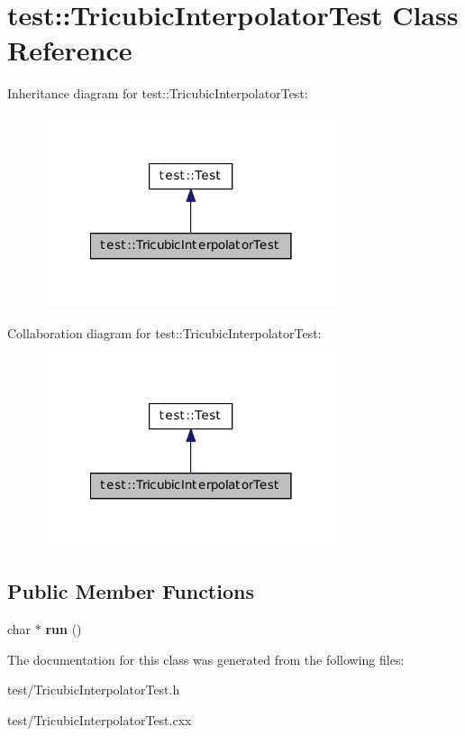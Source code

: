 \hypertarget{classtest_1_1_tricubic_interpolator_test}{
\section{test::TricubicInterpolatorTest Class Reference}
\label{classtest_1_1_tricubic_interpolator_test}
}


Inheritance diagram for test::TricubicInterpolatorTest:\nopagebreak
\begin{figure}[H]
\begin{center}
\leavevmode
\includegraphics[width=246pt]{classtest_1_1_tricubic_interpolator_test__inherit__graph}
\end{center}
\end{figure}


Collaboration diagram for test::TricubicInterpolatorTest:\nopagebreak
\begin{figure}[H]
\begin{center}
\leavevmode
\includegraphics[width=246pt]{classtest_1_1_tricubic_interpolator_test__coll__graph}
\end{center}
\end{figure}
\subsection*{Public Member Functions}
\begin{DoxyCompactItemize}
\item 
\hypertarget{classtest_1_1_tricubic_interpolator_test_a5ea9d6963475b92b69330d84cfc0be85}{
char $\ast$ {\bfseries run} ()}
\label{classtest_1_1_tricubic_interpolator_test_a5ea9d6963475b92b69330d84cfc0be85}

\end{DoxyCompactItemize}


The documentation for this class was generated from the following files:\begin{DoxyCompactItemize}
\item 
test/TricubicInterpolatorTest.h\item 
test/TricubicInterpolatorTest.cxx\end{DoxyCompactItemize}
